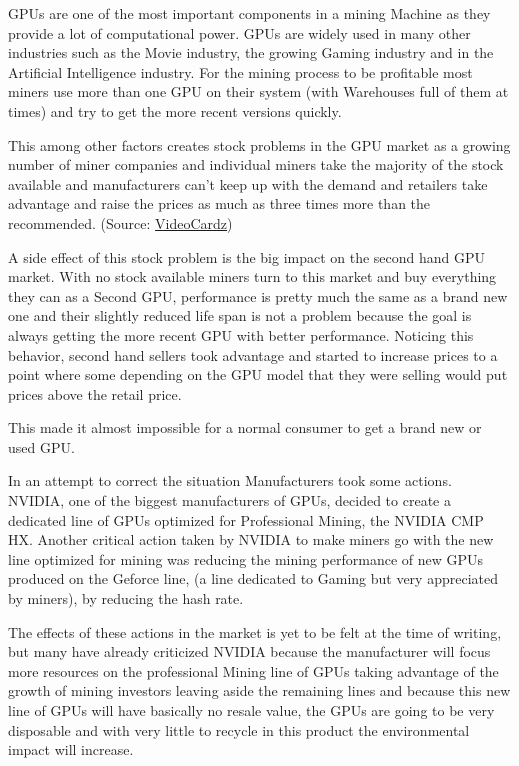 \documentclass{article}
\newcommand\tab[1][1cm]{\hspace*{#1}}
\begin{document}
\tab GPUs are one of the most important components in a mining Machine as they provide a lot of computational power. GPUs are widely used in many other industries such as the Movie industry, the growing Gaming industry and in the Artificial Intelligence industry. For the mining process to be profitable most miners use more than one GPU on their system (with Warehouses full of them at times) and try to get the more recent versions quickly.

This among other factors creates stock problems in the GPU market as a growing number of miner companies and individual miners take the majority of the stock available and manufacturers can’t keep up with the demand and retailers take advantage and raise the prices as much as three times more than the recommended. (Source: \href{https://videocardz.com/newz/nvidia-geforce-rtx-30-graphics-card-cost-3-times-more-than-nvidia-msrp-in-europe}{VideoCardz})

A side effect of this stock problem is the big impact on the second hand GPU market. With no stock available miners turn to this market and buy everything they can as a Second GPU, performance is  pretty much the same as a brand new one and their slightly reduced life span is not a problem because the goal is always getting the more recent GPU with better performance. Noticing this behavior, second hand sellers took advantage and started to increase prices to a point where some depending on the GPU model that they were selling  would put prices above the retail price.

This made it almost impossible for a normal consumer to get a brand new or used GPU.

In an attempt to correct the situation Manufacturers took some actions. NVIDIA, one of the biggest manufacturers of GPUs, decided to create a dedicated line of GPUs optimized for Professional Mining, the NVIDIA CMP HX. Another critical action taken by NVIDIA to make miners go with the new line optimized for mining was reducing the mining performance of new GPUs produced on the Geforce line, (a line dedicated to Gaming but very appreciated by miners), by reducing the hash rate. 

The effects of these actions in the market is yet to be felt at the time of writing, but many have already criticized NVIDIA because the manufacturer will focus more resources on the professional Mining line of GPUs taking advantage of the growth of mining investors  leaving aside the remaining lines and because this new line of GPUs will have basically no resale value, the GPUs are going to be very disposable and with very little to recycle in this product the environmental impact will increase.
\end{document}
